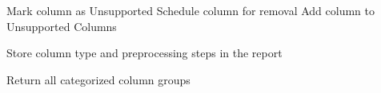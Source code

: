 \begin{algorithm}[H]
\begin{algorithmic}[1]
    \ELSE
        \STATE Mark column as Unsupported
        \STATE Schedule column for removal
        \STATE Add column to Unsupported Columns

    \ENDIF

    \STATE Store column type and preprocessing steps in the report

\ENDFOR

\STATE Return all categorized column groups

\end{algorithmic}
\end{algorithm}